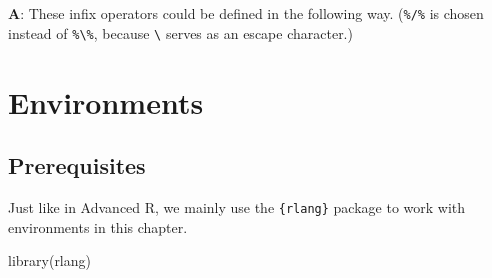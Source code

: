 \documentclass[
]{krantz}
\makeatletter
\newenvironment{Shaded}{\begin{snugshade}}{\end{snugshade}}
\newcommand{\CommentTok}[1]{\textcolor[rgb]{0.56,0.35,0.01}{\textit{#1}}}
\newcommand{\ControlFlowTok}[1]{\textcolor[rgb]{0.13,0.29,0.53}{\textbf{#1}}}
\newcommand{\DataTypeTok}[1]{\textcolor[rgb]{0.13,0.29,0.53}{#1}}
\newcommand{\KeywordTok}[1]{\textcolor[rgb]{0.13,0.29,0.53}{\textbf{#1}}}
\newcommand{\NormalTok}[1]{#1}
\newcommand{\OperatorTok}[1]{\textcolor[rgb]{0.81,0.36,0.00}{\textbf{#1}}}
\newcommand{\StringTok}[1]{\textcolor[rgb]{0.31,0.60,0.02}{#1}}
\newenvironment{kframe}{%
\medskip{}
\setlength{\fboxsep}{.8em}
 \def\at@end@of@kframe{}%
 \ifinner\ifhmode%
  \def\at@end@of@kframe{\end{minipage}}%
  \begin{minipage}{\columnwidth}%
 \fi\fi%
 \def\FrameCommand##1{\hskip\@totalleftmargin \hskip-\fboxsep
 \colorbox{shadecolor}{##1}\hskip-\fboxsep
     \hskip-\linewidth \hskip-\@totalleftmargin \hskip\columnwidth}%
 \MakeFramed {\advance\hsize-\width
   \@totalleftmargin\z@ \linewidth\hsize
   \@setminipage}}%
 {\par\unskip\endMakeFramed%
 \at@end@of@kframe}
\renewenvironment{Shaded}{\begin{kframe}}{\end{kframe}}
\renewcommand{\KeywordTok} [1]{\textcolor[rgb]{0.00,0.44,0.13}{{#1}}}
\renewcommand{\DataTypeTok}[1]{\textcolor[rgb]{0.56,0.13,0.00}{{#1}}}
\renewcommand{\StringTok}  [1]{\textcolor[rgb]{0.25,0.44,0.63}{{#1}}}
\renewcommand{\CommentTok} [1]{\textcolor[rgb]{0.38,0.63,0.69}{{#1}}}
\renewcommand{\NormalTok}  [1]{{#1}}
\makeatother
\begin{document}
\textbf{{A}}: These infix operators could be defined in the following way. (\texttt{\%/\%} is chosen instead of \texttt{\%\textbackslash{}\%}, because \texttt{\textbackslash{}} serves as an escape character.)

\begin{Shaded}
\end{Shaded}

\hypertarget{environments}{%
\chapter{Environments}\label{environments}}

\hypertarget{prerequisites-1}{%
\section*{Prerequisites}\label{prerequisites-1}}


Just like in Advanced R, we mainly use the \texttt{\{rlang\}} package to work with environments in this chapter.

\begin{Shaded}
\begin{Highlighting}[]
\KeywordTok{library}\NormalTok{(rlang)}
\end{Highlighting}
\end{Shaded}
\end{document}
